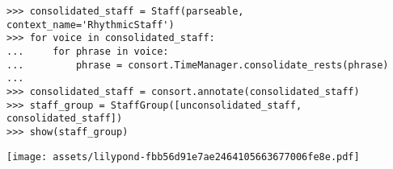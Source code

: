 \begin{comment}
<abjad>
consolidated_staff = Staff(parseable, context_name='RhythmicStaff')
for voice in consolidated_staff:
    for phrase in voice:
        phrase = consort.TimeManager.consolidate_rests(phrase)

consolidated_staff = consort.annotate(consolidated_staff)
staff_group = StaffGroup([unconsolidated_staff, consolidated_staff])
show(staff_group)
</abjad>
\end{comment}

\begin{singlespacing}
\vspace{-0.5\baselineskip}
\begin{lstlisting}
>>> consolidated_staff = Staff(parseable, context_name='RhythmicStaff')
>>> for voice in consolidated_staff:
...     for phrase in voice:
...         phrase = consort.TimeManager.consolidate_rests(phrase)
...
>>> consolidated_staff = consort.annotate(consolidated_staff)
>>> staff_group = StaffGroup([unconsolidated_staff, consolidated_staff])
>>> show(staff_group)
\end{lstlisting}
\noindent\texttt{[image: assets/lilypond-fbb56d91e7ae2464105663677006fe8e.pdf]}
\end{singlespacing}
